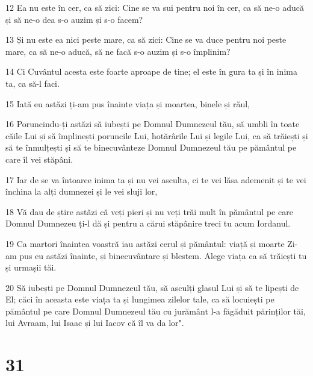 \par 12 Ea nu este în cer, ca să zici: Cine se va sui pentru noi în cer, ca să ne-o aducă și să ne-o dea s-o auzim și s-o facem?
\par 13 Și nu este ea nici peste mare, ca să zici: Cine se va duce pentru noi peste mare, ca să ne-o aducă, să ne facă s-o auzim și s-o împlinim?
\par 14 Ci Cuvântul acesta este foarte aproape de tine; el este în gura ta și în inima ta, ca să-l faci.
\par 15 Iată eu astăzi ți-am pus înainte viața și moartea, binele și răul,
\par 16 Poruncindu-ți astăzi să iubești pe Domnul Dumnezeul tău, să umbli în toate căile Lui și să împlinești poruncile Lui, hotărârile Lui și legile Lui, ca să trăiești și să te înmulțești și să te binecuvânteze Domnul Dumnezeul tău pe pământul pe care îl vei stăpâni.
\par 17 Iar de se va întoarce inima ta și nu vei asculta, ci te vei lăsa ademenit și te vei închina la alți dumnezei și le vei sluji lor,
\par 18 Vă dau de știre astăzi că veți pieri și nu veți trăi mult în pământul pe care Domnul Dumnezeu ți-l dă și pentru a cărui stăpânire treci tu acum Iordanul.
\par 19 Ca martori înaintea voastră iau astăzi cerul și pământul: viață și moarte Zi-am pus eu astăzi înainte, și binecuvântare și blestem. Alege viața ca să trăiești tu și urmașii tăi.
\par 20 Să iubești pe Domnul Dumnezeul tău, să asculți glasul Lui și să te lipești de El; căci în aceasta este viața ta și lungimea zilelor tale, ca să locuiești pe pământul pe care Domnul Dumnezeul tău cu jurământ l-a făgăduit părinților tăi, lui Avraam, lui Isaac și lui Iacov că îl va da lor".

\chapter{31}

